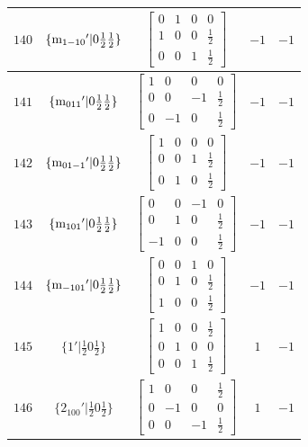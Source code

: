 \documentclass[fleqn,8pt]{jsarticle}
\begin{document}
\begin{longtable}{ccccc}
$ 140 $ & $ \{{\rm m}_{1-10}{}'|0 \frac{1}{2} \frac{1}{2}\} $ & $ \begin{bmatrix} 0 & 1 & 0 & 0 \\ 1 & 0 & 0 & \frac{1}{2} \\ 0 & 0 & 1 & \frac{1}{2} \end{bmatrix} $ & $ -1 $ & $ -1 $ \\ \hline
$ 141 $ & $ \{{\rm m}_{011}{}'|0 \frac{1}{2} \frac{1}{2}\} $ & $ \begin{bmatrix} 1 & 0 & 0 & 0 \\ 0 & 0 & -1 & \frac{1}{2} \\ 0 & -1 & 0 & \frac{1}{2} \end{bmatrix} $ & $ -1 $ & $ -1 $ \\ \hline
$ 142 $ & $ \{{\rm m}_{01-1}{}'|0 \frac{1}{2} \frac{1}{2}\} $ & $ \begin{bmatrix} 1 & 0 & 0 & 0 \\ 0 & 0 & 1 & \frac{1}{2} \\ 0 & 1 & 0 & \frac{1}{2} \end{bmatrix} $ & $ -1 $ & $ -1 $ \\ \hline
$ 143 $ & $ \{{\rm m}_{101}{}'|0 \frac{1}{2} \frac{1}{2}\} $ & $ \begin{bmatrix} 0 & 0 & -1 & 0 \\ 0 & 1 & 0 & \frac{1}{2} \\ -1 & 0 & 0 & \frac{1}{2} \end{bmatrix} $ & $ -1 $ & $ -1 $ \\ \hline
$ 144 $ & $ \{{\rm m}_{-101}{}'|0 \frac{1}{2} \frac{1}{2}\} $ & $ \begin{bmatrix} 0 & 0 & 1 & 0 \\ 0 & 1 & 0 & \frac{1}{2} \\ 1 & 0 & 0 & \frac{1}{2} \end{bmatrix} $ & $ -1 $ & $ -1 $ \\ \hline
$ 145 $ & $ \{1{}'|\frac{1}{2} 0 \frac{1}{2}\} $ & $ \begin{bmatrix} 1 & 0 & 0 & \frac{1}{2} \\ 0 & 1 & 0 & 0 \\ 0 & 0 & 1 & \frac{1}{2} \end{bmatrix} $ & $ 1 $ & $ -1 $ \\ \hline
$ 146 $ & $ \{2{}_{100}{}'|\frac{1}{2} 0 \frac{1}{2}\} $ & $ \begin{bmatrix} 1 & 0 & 0 & \frac{1}{2} \\ 0 & -1 & 0 & 0 \\ 0 & 0 & -1 & \frac{1}{2} \end{bmatrix} $ & $ 1 $ & $ -1 $ \\ \hline

\end{longtable}
\end{document}
